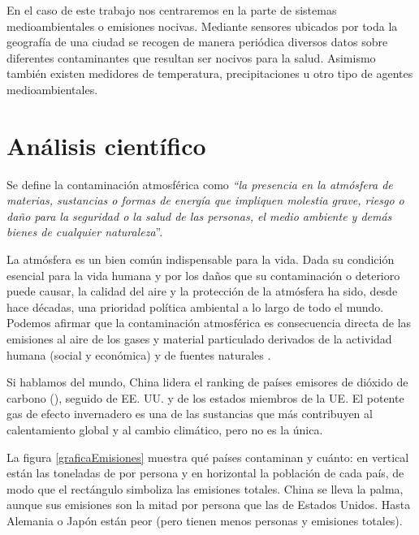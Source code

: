 En el caso de este trabajo nos centraremos en la parte de sistemas medioambientales o emisiones nocivas. Mediante sensores ubicados por toda la geografía de una ciudad se recogen de manera periódica diversos datos sobre diferentes contaminantes que resultan ser nocivos para la salud. Asimismo también existen medidores de temperatura, precipitaciones u otro tipo de agentes medioambientales. 


\section{Análisis científico}\label{teorico-cientifico}

Se define la contaminación atmosférica como \textit{“la presencia en la atmósfera de materias, sustancias o formas de energía que impliquen molestia grave, riesgo o daño para la seguridad o la salud de las personas, el medio ambiente y demás bienes de cualquier naturaleza}”.

La atmósfera es un bien común indispensable para la vida. Dada su condición esencial para la vida humana y por los daños que su contaminación o deterioro puede causar, la calidad del aire y la protección de la atmósfera ha sido, desde hace décadas, una prioridad política ambiental a lo largo de todo el mundo. Podemos afirmar que la contaminación atmosférica es consecuencia directa de las emisiones al aire de los gases y material particulado derivados de la actividad humana (social y económica) y de fuentes naturales \cite{informe_2018}.

Si hablamos del mundo, China lidera el ranking de países emisores de dióxido de carbono (), seguido de EE. UU. y de los estados miembros de la UE.  El potente gas de efecto invernadero es una de las sustancias que más contribuyen al calentamiento global y al cambio climático, pero no es la única. 


La figura \ref{graficaEmisiones} muestra qué países contaminan y cuánto: en vertical están las toneladas de  por persona y en horizontal la población de cada país, de modo que el rectángulo simboliza las emisiones totales. China se lleva la palma, aunque sus emisiones son la mitad por persona que las de Estados Unidos. Hasta Alemania o Japón están peor (pero tienen menos personas y emisiones totales). 

